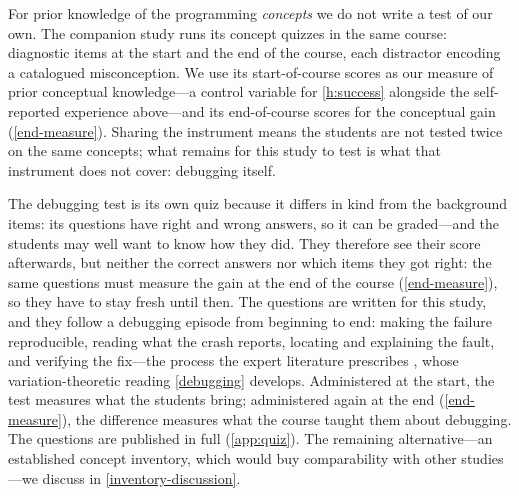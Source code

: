 For prior knowledge of the programming \emph{concepts} we do not write
a test of our own.
The companion study \autocite{VTProgMisconceptions} runs its concept
quizzes in the same course: diagnostic items at the start and the end
of the course, each distractor encoding a catalogued misconception.
We use its start-of-course scores as our measure of prior conceptual
knowledge---a control variable for \cref{h:success} alongside the
self-reported experience above---and its end-of-course scores for the
conceptual gain (\cref{end-measure}).
Sharing the instrument means the students are not tested twice on the
same concepts; what remains for this study to test is what that
instrument does not cover: debugging itself.

The debugging test is its own quiz because it differs in kind from the
background items: its questions have right and wrong answers, so it can
be graded---and the students may well want to know how they did.
They therefore see their score afterwards, but neither the correct
answers nor which items they got right: the same questions must measure
the gain at the end of the course (\cref{end-measure}), so they have to
stay fresh until then.
The questions are written for this study, and they follow a debugging
episode from beginning to end: making the failure reproducible, reading
what the crash reports, locating and explaining the fault, and
verifying the fix---the process the expert literature prescribes
\autocite{WhyProgramsFail}, whose variation-theoretic reading
\cref{debugging} develops.
Administered at the start, the test measures what the students bring;
administered again at the end (\cref{end-measure}), the difference
measures what the course taught them about debugging.
The questions are published in full (\cref{app:quiz}).
The remaining alternative---an established concept inventory, which
would buy comparability with other studies---we discuss in
\cref{inventory-discussion}.

